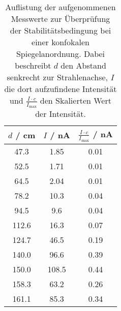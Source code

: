 \begin{table}
\centering
\caption{Auflistung der aufgenommenen Messwerte zur Überprüfung der
Stabilitätsbedingung bei einer konfokalen Spiegelanordnung. Dabei beschreibt
$d$ den Abstand senkrecht zur Strahlenachse, $I$ die dort aufzufindene Intensität
und $\frac{I \cdot c}{I_\text{max}}$ den Skalierten Wert der Intensität.}

\begin{tabular}{ccc}
\toprule
$d$ / \si{\centi\meter} & $I$ / \si{\nano\ampere} & $\frac{I \cdot c}{I_\text{max}}$ / \si{\nano\ampere}\\
\midrule
47.3 & 1.85 & 0.01 \\
52.5 & 1.71 & 0.01 \\
64.5 & 2.04 & 0.01 \\
78.2 & 10.3 & 0.04 \\
94.5 & 9.6 & 0.04 \\
112.6 & 16.3 & 0.07 \\
124.7 & 46.5 & 0.19 \\
140.0 & 96.6 & 0.39 \\
150.0 & 108.5 & 0.44 \\
158.3 & 63.2 & 0.26 \\
161.1 & 85.3 & 0.34 \\
\bottomrule
\end{tabular}
\label{tab:kk}
\end{table}
